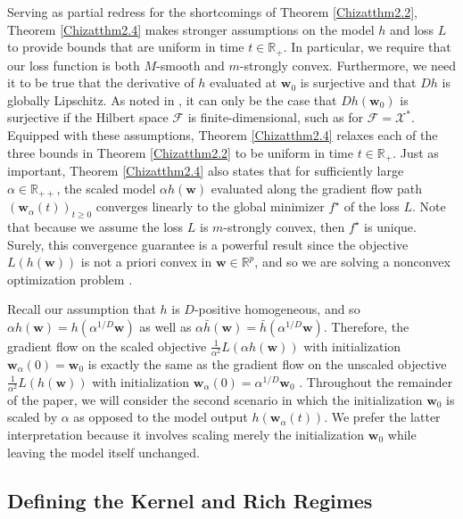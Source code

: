 \documentclass{article}
\begin{document}
Serving as partial redress for the shortcomings of Theorem \ref{Chizatthm2.2}, Theorem \ref{Chizatthm2.4} makes stronger assumptions on the model $h$ and loss $L$ to provide bounds that are uniform in time $t \in \mathbb{R}_+$. In particular, we require that our loss function is both $M$-smooth and $m$-strongly convex. Furthermore, we need it to be true that the derivative of $h$ evaluated at $\boldsymbol{w}_0$ is surjective and that $Dh$ is globally Lipschitz. As noted in \cite{chizat2019lazy}, it can only be the case that $Dh(\boldsymbol{w}_0)$ is surjective if the Hilbert space $\mathcal{F}$ is finite-dimensional, such as for $\mathcal{F} = \mathcal{X}^*$. Equipped with these assumptions, Theorem \ref{Chizatthm2.4} relaxes each of the three bounds in Theorem \ref{Chizatthm2.2} to be uniform in time $t \in \mathbb{R}_+$. Just as important, Theorem \ref{Chizatthm2.4} also states that for sufficiently large $\alpha \in \mathbb{R}_{++}$, the scaled model $\alpha h(\boldsymbol{w})$ evaluated along the gradient flow path $(\boldsymbol{w}_{\alpha}(t))_{t \geq 0}$ converges linearly to the global minimizer $f^{\star}$ of the loss $L$. Note that because we assume the loss $L$ is $m$-strongly convex, then $f^{\star}$ is unique. Surely, this convergence guarantee is a powerful result since the objective $L(h(\boldsymbol{w}))$ is not a priori convex in $\boldsymbol{w} \in \mathbb{R}^p$, and so we are solving a nonconvex optimization problem \cite{chizat2019lazy}.

Recall our assumption that $h$ is $D$-positive homogeneous, and so $\alpha h(\boldsymbol{w}) = h(\alpha^{1/D}\boldsymbol{w})$ as well as $\alpha \bar{h}(\boldsymbol{w}) = \bar{h}(\alpha^{1/D}\boldsymbol{w})$.
Therefore, the gradient flow on the scaled objective $\frac{1}{\alpha^2}L(\alpha h(\boldsymbol{w}))$ with initialization $\boldsymbol{w}_{\alpha}(0) = \boldsymbol{w}_0$ is exactly the same as the gradient flow on the unscaled objective $\frac{1}{\alpha^2}L(h(\boldsymbol{w}))$ with initialization $\boldsymbol{w}_{\alpha}(0) = \alpha^{1/D}\boldsymbol{w}_0$ \cite{woodworth2020kernel}. Throughout the remainder of the paper, we will consider the second scenario in which the initialization $\boldsymbol{w}_0$ is scaled by $\alpha$ as opposed to the model output $h(\boldsymbol{w}_{\alpha}(t))$. We prefer the latter interpretation because it involves scaling merely the initialization $\boldsymbol{w}_0$ while leaving the model itself unchanged.

\subsection{Defining the Kernel and Rich Regimes}\label{defkernelrich}
\end{document}
